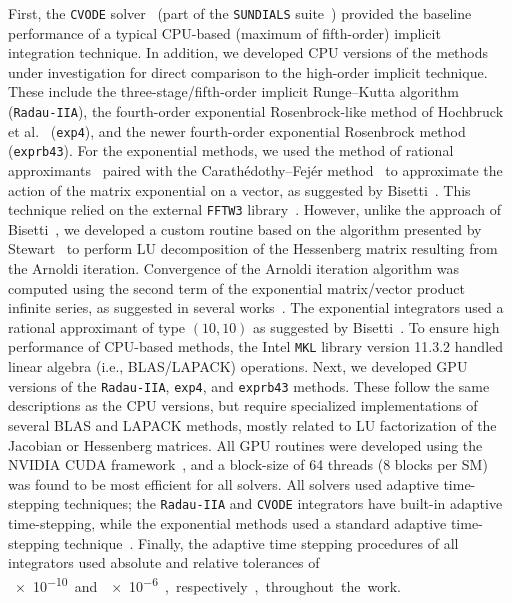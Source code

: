 \documentclass[preprint,review,11pt]{elsarticle}
\begin{document}
First, the \texttt{CVODE} solver~\cite{Hindmarsh:2005hg,cvode:2.8.2} (part of the \texttt{SUNDIALS} suite~\cite{sundials:2.6.2}) provided the baseline performance of a typical CPU-based (maximum of fifth-order) implicit integration technique.
In addition, we developed CPU versions of the methods under investigation for direct comparison to the high-order implicit technique.
These include the three-stage\slash fifth-order implicit Runge--Kutta algorithm~\cite{wanner1991solving} (\texttt{Radau-IIA}), the fourth-order exponential Rosenbrock-like method of Hochbruck et al.~\cite{Hochbruck:1998} (\texttt{exp4}), and the newer fourth-order exponential Rosenbrock method~\cite{Hockbruck:2009} (\texttt{exprb43}).
For the exponential methods, we used the method of rational approximants~\cite{gallopoulos:1992} paired with the Carath\'edothy--Fej\'er method~\cite{trefethen:2006,kyle_niemeyer_2016_44291} to approximate the action of the matrix exponential on a vector, as suggested by Bisetti~\cite{Bisetti:2012jw}.
This technique relied on the external \texttt{FFTW3} library~\cite{frigo2005design,fftw:3.3.4}.
However, unlike the approach of Bisetti~\cite{Bisetti:2012jw}, we developed a custom routine based on the algorithm presented by Stewart~\cite{stewart:1998} to perform LU decomposition of the Hessenberg matrix resulting from the Arnoldi iteration.
Convergence of the Arnoldi iteration algorithm was computed using the second term of the exponential matrix\slash vector product infinite series, as suggested in several works~\cite{Bisetti:2012jw,saad:1992}.
The exponential integrators used a rational approximant of type $\left(10,10\right)$ as suggested by Bisetti~\cite{Bisetti:2012jw}.
To ensure high performance of CPU-based methods, the Intel \texttt{MKL} library version 11.3.2 handled linear algebra (i.e., BLAS\slash LAPACK) operations.
Next, we developed GPU versions of the \texttt{Radau-IIA}, \texttt{exp4}, and \texttt{exprb43} methods.
These follow the same descriptions as the CPU versions, but require specialized implementations of several BLAS and LAPACK methods, mostly related to LU factorization of the Jacobian or Hessenberg matrices.
All GPU routines were developed using the NVIDIA CUDA framework~\cite{Buck:2008aa,NVIDIA:2015aa}, and a block-size of 64 threads (8 blocks per SM) was found to be most efficient for all solvers.
All solvers used adaptive time-stepping techniques; the \texttt{Radau-IIA} and \texttt{CVODE} integrators have built-in adaptive time-stepping, while the exponential methods used a standard adaptive time-stepping technique~\cite{wanner1991solving}.
Finally, the adaptive time stepping procedures of all integrators used absolute and relative tolerances of \SI{e-10} and \SI{e-6}, respectively, throughout the work.
\end{document}
